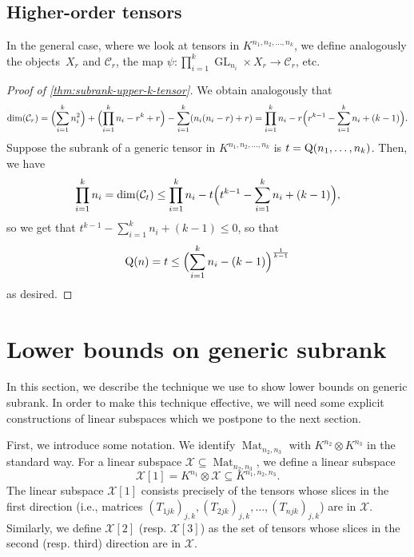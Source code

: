 \documentclass[10pt,a4paper]{article}
\theoremstyle{definition}
\theoremstyle{remark}
\newcommand{\gensubrank}{{\rm Q}}
\newcommand{\GL}{\operatorname{GL}}
\newcommand{\Mat}{\operatorname{Mat}}
\begin{document}
\subsection{Higher-order tensors}
In the general case, where we look at tensors in $K^{n_1,n_2,\dots,n_k}$, we define analogously the objects~$X_r$ and $\mathcal{C}_r$, the map $\psi: \prod_{i=1}^k \GL_{n_i} \times X_r \rightarrow \mathcal{C}_r$, etc. 

\begin{proof} [Proof of \autoref{thm:subrank-upper-k-tensor}]
We obtain analogously that 
$$
\dim(\mathcal{C}_r) = \Bigl(\sum_{i=1}^k n_i^2\Bigr) + \Bigl(\prod_{i=1}^k n_i - r^k + r\Bigr) - \sum_{i=1}^k (n_i(n_i - r) + r) = \prod_{i=1}^k n_i - r\Bigl(r^{k-1} - \sum_{i=1}^k n_i + (k-1)\Bigr).
$$
Suppose the subrank of a generic tensor in $K^{n_1,n_2,\dots,n_k}$ is $t = \gensubrank(n_1,\ldots,n_k)$. Then, we have
$$
\prod_{i=1}^k n_i = \dim(\mathcal{C}_t) \leq \prod_{i=1}^k n_i - t\Bigl(t^{k-1} - \sum_{i=1}^k n_i + (k-1)\Bigr),
$$
so we get that $t^{k-1} - \sum_{i=1}^k n_i + (k-1) \leq 0$, so that 
\[
\gensubrank(n) = t \leq \Bigl(\sum_{\smash{i=1}}^k n_i - (k-1)\Bigr)^{\frac{1}{k-1}}
\]
as desired.
\end{proof}












\section{Lower bounds on generic subrank}\label{sec:lower-bounds}

In this section, we describe the technique we use to show lower bounds on generic subrank. In order to make this technique effective, we will need some explicit constructions of linear subspaces which we postpone to the next section. 

First, we introduce some notation. We identify $\Mat_{n_2,n_3}$ with $K^{n_2} \otimes K^{n_3}$ in the standard way. For a linear subspace $\mathcal{X} \subseteq \Mat_{n_2,n_3}$, we define a linear subspace
$$
\mathcal{X}[1] = K^{n_1} \otimes \mathcal{X} \subseteq K^{n_1,n_2,n_3}.
$$
The linear subspace $\mathcal{X}[1]$ consists precisely of the tensors whose slices in the first direction (i.e., matrices $(T_{1jk})_{j,k},(T_{2jk})_{j,k},\dots,(T_{njk})_{j,k}$) are in $\mathcal{X}$. Similarly, we define $\mathcal{X}[2]$ (resp. $\mathcal{X}[3]$)  as the set of tensors whose slices in the second (resp. third) direction are in $\mathcal{X}$.
\end{document}
